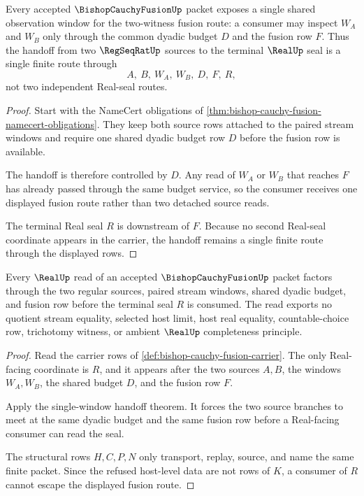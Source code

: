 \begin{theorem}
\label{thm:bishop-cauchy-fusion-single-window-handoff}
Every accepted $\BishopCauchyFusionUp$ packet exposes a single shared observation window for the two-witness fusion route: a consumer may inspect $W_A$ and $W_B$ only through the common dyadic budget $D$ and the fusion row $F$. Thus the handoff from two $\RegSeqRatUp$ sources to the terminal $\RealUp$ seal is a single finite route through
$$
A,\ B,\ W_A,\ W_B,\ D,\ F,\ R,
$$
not two independent Real-seal routes.
\end{theorem}
\begin{proof}
Start with the NameCert obligations of \autoref{thm:bishop-cauchy-fusion-namecert-obligations}. They keep both source rows attached to the paired stream windows and require one shared dyadic budget row $D$ before the fusion row is available.

The handoff is therefore controlled by $D$. Any read of $W_A$ or $W_B$ that reaches $F$ has already passed through the same budget service, so the consumer receives one displayed fusion route rather than two detached source reads.

The terminal Real seal $R$ is downstream of $F$. Because no second Real-seal coordinate appears in the carrier, the handoff remains a single finite route through the displayed rows.
\end{proof}

\begin{theorem}
\label{thm:bishop-cauchy-fusion-real-seal-nonescape}
Every $\RealUp$ read of an accepted $\BishopCauchyFusionUp$ packet factors through the two regular sources, paired stream windows, shared dyadic budget, and fusion row before the terminal seal $R$ is consumed. The read exports no quotient stream equality, selected host limit, host real equality, countable-choice row, trichotomy witness, or ambient $\RealUp$ completeness principle.
\end{theorem}
\begin{proof}
Read the carrier rows of \autoref{def:bishop-cauchy-fusion-carrier}. The only Real-facing coordinate is $R$, and it appears after the two sources $A,B$, the windows $W_A,W_B$, the shared budget $D$, and the fusion row $F$.

Apply the single-window handoff theorem. It forces the two source branches to meet at the same dyadic budget and the same fusion row before a Real-facing consumer can read the seal.

The structural rows $H,C,P,N$ only transport, replay, source, and name the same finite packet. Since the refused host-level data are not rows of $K$, a consumer of $R$ cannot escape the displayed fusion route.
\end{proof}

